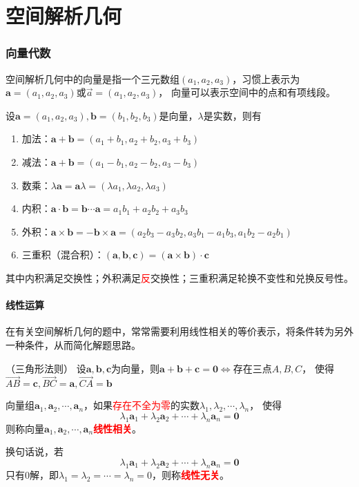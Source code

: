 \part{空间解析几何}
\section{向量代数}
空间解析几何中的向量是指一个三元数组$(a_1,a_2,a_3)$，习惯上表示为$\bm{a}=(a_1,a_2,a_3 )$或$\vec{a}=(a_1,a_2,a_3)$，
向量可以表示空间中的点和有项线段。

\begin{definition}
    设$\bm{a} = (a_1,a_2,a_3),\bm{b} = (b_1,b_2,b_3)$是向量，$\lambda$是实数，则有
    \begin{enumerate}[(1)]
        \item 加法：$\bm{a}+\bm{b} = (a_1+b_1,a_2+b_2,a_3+b_3)$
        \item 减法：$\bm{a}+\bm{b} = (a_1-b_1,a_2-b_2,a_3-b_3)$
        \item 数乘：$\lambda\bm{a} = \bm{a}\lambda = (\lambda a_1, \lambda a_2, \lambda a_3)$
        \item 内积：$\bm{a}\cdot\bm{b} = \bm{b}\cdots\bm{a} = a_1b_1+a_2b_2+a_3b_3$
        \item 外积：$\bm{a}\times\bm{b} = -\bm{b}\times\bm{a} = (a_2b_3-a_3b_2, a_3b_1-a_1b_3, a_1b_2-a_2b_1)$
        \item 三重积（混合积）：$(\bm{a},\bm{b},\bm{c}) = (\bm{a}\times\bm{b})\cdot\bm{c}$
    \end{enumerate}
\end{definition}
其中内积满足交换性；外积满足\textcolor{red}{反}交换性；三重积满足轮换不变性和兑换反号性。
\subsection{线性运算}
在有关空间解析几何的题中，常常需要利用线性相关的等价表示，将条件转为另外一种条件，从而简化解题思路。
\begin{theorem}
    （三角形法则）
    \label{th:三角形法则}
    设$\bm{a},\bm{b},\bm{c}$为向量，则$\bm{a}+\bm{b}+\bm{c}=\bm{0}\iff$存在三点$A,B,C$，
    使得$\overrightarrow{AB}=\bm{c},\overrightarrow{BC}=\bm{a},\overrightarrow{CA}=\bm{b}$
\end{theorem}

\begin{definition}
    向量组$\bm{a}_1,\bm{a}_2,\cdots,\bm{a}_n$，如果\textcolor{red}{存在不全为零}的实数$\lambda_1,\lambda_2,\cdots,\lambda_n$，
    使得
    \[ \lambda_1\bm{a}_1 + \lambda_2\bm{a}_2 + \cdots + \lambda_n\bm{a}_n = \bm{0} \]
    则称向量$\bm{a}_1,\bm{a}_2,\cdots,\bm{a}_n$\textcolor{red}{\textbf{\textsf{线性相关}}}。

    换句话说，若
    \[ \lambda_1\bm{a}_1 + \lambda_2\bm{a}_2 + \cdots + \lambda_n\bm{a}_n = \bm{0} \]
    只有$0$解，即$\lambda_1 = \lambda_2 = \cdots = \lambda_n = 0$，则称\textcolor{red}{\textbf{\textsf{线性无关}}}。
\end{definition}

